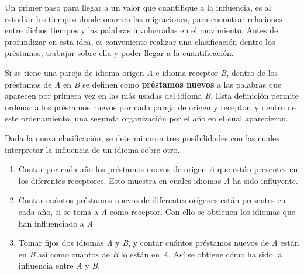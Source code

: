 
Un primer paso para llegar a un valor que cuantifique a la influencia, es al estudiar los tiempos donde ocurren las migraciones, para encontrar relaciones entre dichos tiempos y las palabras involucradas en el movimiento. Antes de
profundizar en esta idea, es conveniente realizar una clasificación dentro los
préstamos, trabajar sobre ella y poder llegar a la cuantificación. 

Si se tiene una pareja de idioma origen \textit{A} e idioma receptor
\textit{B},  dentro de los préstamos de \textit{A} en \textit{B} se definen
como  \textbf{préstamos nuevos} a las  palabras que aparecen por primera vez en
las más usadas del idioma \textit{B}. Esta definición permite ordenar a los
préstamos nuevos por cada pareja de origen y receptor, y dentro  de este
ordenamiento, una segunda organización  por el año en el cual aparecieron. 



Dada la nueva clasificación, se determinaron tres posibilidades con las cuales
interpretar la influencia de un idioma sobre otro. 

\begin{enumerate}
	\label{proceso.nuevos}
	
\item Contar por cada año los préstamos nuevos de origen \textit{A} que están presentes en los diferentes receptores. Esto muestra en cuales idiomas \textit{A} ha sido influyente. 

\item Contar cuántos préstamos nuevos de diferentes orígenes están presentes en cada año, si se toma a \textit{A} como receptor. Con ello se obtienen los idiomas que han influenciado a \textit{A}




\item Tomar fijos dos idiomas \textit{A} y \textit{B}, y contar cuántos préstamos nuevos de \textit{A} están en \textit{B} así como cuantos de \textit{B} lo están en \textit{A}.  Así se obtiene cómo ha sido la influencia entre \textit{A} y \textit{B}.



\end{enumerate}


